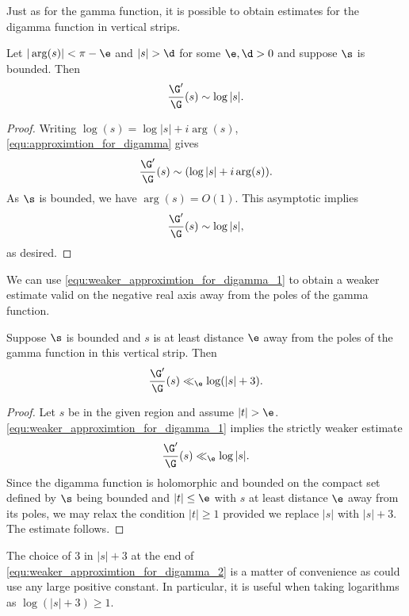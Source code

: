 \documentclass[12pt]{article}
\begin{document}
      Just as for the gamma function, it is possible to obtain estimates for the digamma function in vertical strips.

      \begin{corollary}\label{equ:weaker_approximtion_for_digamma_1}
        Let \(|\arg(s)| < \pi-\e\) and \(|s| > \d\) for some \(\e,\d > 0\) and suppose \(\s\) is bounded. Then
        \[
          \frac{\G'}{\G}(s) \sim \log|s|.
        \]
      \end{corollary}
      \begin{proof}
        Writing \(\log(s) = \log|s|+i\arg(s)\), \cref{equ:approximtion_for_digamma} gives
        \[
          \frac{\G'}{\G}(s) \sim (\log|s|+i\arg(s)).
        \]
        As \(\s\) is bounded, we have \(\arg(s) = O(1)\). This asymptotic implies
        \[
          \frac{\G'}{\G}(s) \sim \log|s|,
        \]
        as desired.
      \end{proof}

      We can use \cref{equ:weaker_approximtion_for_digamma_1} to obtain a weaker estimate valid on the negative real axis away from the poles of the gamma function.

      \begin{corollary}\label{equ:weaker_approximtion_for_digamma_2}
        Suppose \(\s\) is bounded and \(s\) is at least distance \(\e\) away from the poles of the gamma function in this vertical strip. Then
        \[
          \frac{\G'}{\G}(s) \ll_{\e} \log(|s|+3).
        \]
      \end{corollary}
      \begin{proof}
        Let \(s\) be in the given region and assume \(|t| > \e\). \cref{equ:weaker_approximtion_for_digamma_1} implies the strictly weaker estimate
        \[
          \frac{\G'}{\G}(s) \ll_{\e} \log|s|.
        \]
        Since the digamma function is holomorphic and bounded on the compact set defined by \(\s\) being bounded and \(|t| \le \e\) with \(s\) at least distance \(\e\) away from its poles, we may relax the condition \(|t| \ge 1\) provided we replace \(|s|\) with \(|s|+3\). The estimate follows.
      \end{proof}

      The choice of \(3\) in \(|s|+3\) at the end of \cref{equ:weaker_approximtion_for_digamma_2} is a matter of convenience as could use any large positive constant. In particular, it is useful when taking logarithms as \(\log(|s|+3) \ge 1\).
\end{document}
